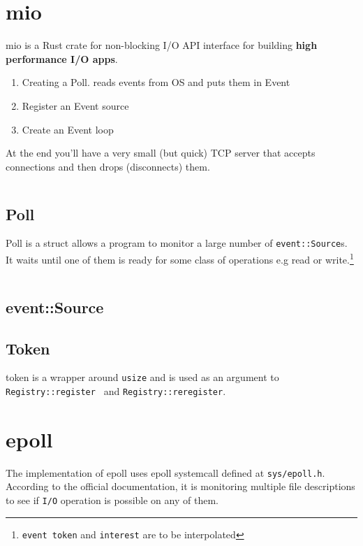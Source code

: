 \documentclass[10pt,a4paper]{article}
\begin{document}
	\section*{mio}
	mio is a Rust crate for non-blocking I/O API interface for building \textbf{high performance I/O apps}.
	\begin{enumerate}

		\item Creating a Poll. reads events from OS and puts them in Event
		\item Register an Event source
		\item Create an Event loop

	\end{enumerate}
	At the end you’ll have a very small (but quick) TCP server that accepts connections and then drops (disconnects) them.
	

\inputminted{rust}{fig01.rs}

\subsection*{Poll}
Poll is a struct allows a program to monitor a large number of \texttt{event::Source}s. It waits until one of them is ready for some class of operations e.g read or write.\footnote{\texttt{event }\texttt{token} and \texttt{interest} are to be interpolated}

\inputminted{rust}{fig02.rs}

\subsection*{event::Source}

\subsection*{Token}
token is a wrapper around \texttt{usize} and is used as an argument to \texttt{Registry::register } and \texttt{Registry::reregister}.
\section*{epoll}
The implementation of epoll uses epoll systemcall defined at \texttt{sys/epoll.h}.
According to the official documentation, it is monitoring multiple file descriptions to see if \texttt{I/O} operation is possible on any of them.
\end{document}
